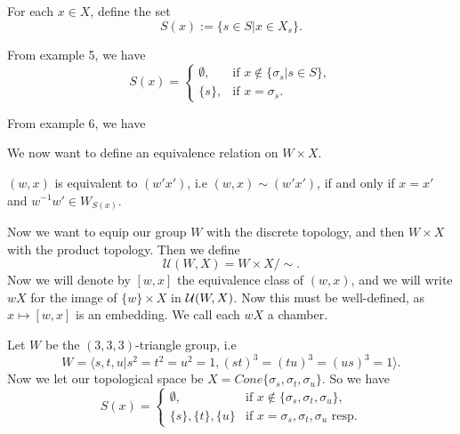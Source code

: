 \documentclass[12pt]{article}
\begin{document}
\begin{definition}
    For each $x\in X$, define the set
    \[S(x):=\{s\in S|x\in X_s\}.\]
\end{definition}

\begin{example}
    From example 5, we have
    \[S(x)=\begin{cases}\emptyset, & \text{if } x\notin \{\sigma_s|s\in S\},\\
        \{s\}, & \text{if } x=\sigma_s.
    \end{cases}\]
\end{example}

\begin{example}
    From example 6, we have
    \[\]
\end{example}

We now want to define an equivalence relation on $W\times X$. 
\begin{definition}
    $(w,x)$ is equivalent to $(w'x')$, i.e $(w,x)\sim (w'x')$, if and only if $x=x'$ and $w^{-1}w'\in W_{S(x)}.$  
\end{definition}

Now we want to equip our group $W$ with the discrete topology, and then $W\times X$ with the product topology. Then we define
\[\mathcal{U}(W,X)=W\times X/\sim.\]
Now we will denote by $[w,x]$ the equivalence class of $(w,x)$, and we will write $wX$ for the image of $\{w\}\times X$ in $\mathcal{U}(W,X)$. Now this must be well-defined, as $x\mapsto [w,x]$ is an embedding. We call each $wX$ a chamber. 

\begin{example}
    Let $W$ be the $(3,3,3)$-triangle group, i.e
    \[W=\langle s,t,u|s^2=t^2=u^2=1,(st)^3=(tu)^3=(us)^3=1\rangle.\]
    Now we let our topological space be $X=Cone\{\sigma_s,\sigma_t,\sigma_u\}$. So we have
    \[S(x)=\begin{cases}
        \emptyset, & \text{if } x\notin \{\sigma_s,\sigma_t,\sigma_u\},\\
        \{s\}, \{t\}, \{u\} & \text{if } x=\sigma_s,\sigma_t,\sigma_u \text{ resp.}
    \end{cases}\]
\end{example}
\end{document}
